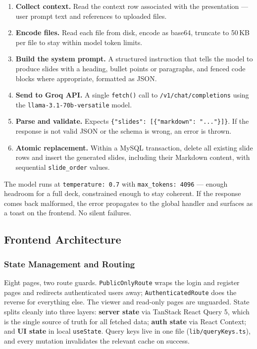 \documentclass[10pt,a4paper]{article}
\begin{document}
\begin{enumerate}[noitemsep, topsep=4pt]
  \item \textbf{Collect context.} Read the context row associated with the presentation --- user prompt text and references to uploaded files.
  \item \textbf{Encode files.} Read each file from disk, encode as base64, truncate to 50\,KB per file to stay within model token limits.
  \item \textbf{Build the system prompt.} A structured instruction that tells the model to produce slides with a heading, bullet points or paragraphs, and fenced code blocks where appropriate, formatted as JSON.
\item \textbf{Send to Groq API.} A single \texttt{fetch()} call to \texttt{/v1/chat/completions} using the \texttt{llama-3.1-}\allowbreak\texttt{70b-versatile} model.
  \item \textbf{Parse and validate.} Expects \texttt{\{"slides": [\{"markdown": "..."\}]\}}. If the response is not valid JSON or the schema is wrong, an error is thrown.
  \item \textbf{Atomic replacement.} Within a MySQL transaction, delete all existing slide rows and insert the generated slides, including their Markdown content, with sequential \texttt{slide\_order} values.
\end{enumerate}

The model runs at \texttt{temperature: 0.7} with \texttt{max\_tokens: 4096} --- enough headroom for a full deck, constrained enough to stay coherent. If the response comes back malformed, the error propagates to the global handler and surfaces as a toast on the frontend. No silent failures.

\subsection{Frontend Architecture}

\subsubsection{State Management and Routing}

Eight pages, two route guards. \texttt{PublicOnly}\allowbreak\texttt{Route} wraps the login and register pages and redirects authenticated users away; \texttt{Authenticated}\allowbreak\texttt{Route} does the reverse for everything else. The viewer and read-only pages are unguarded. State splits cleanly into three layers: \textbf{server state} via TanStack React Query 5, which is the single source of truth for all fetched data; \textbf{auth state} via React Context; and \textbf{UI state} in local \texttt{useState}. Query keys live in one file (\texttt{lib/queryKeys.ts}), and every mutation invalidates the relevant cache on success.
\end{document}
